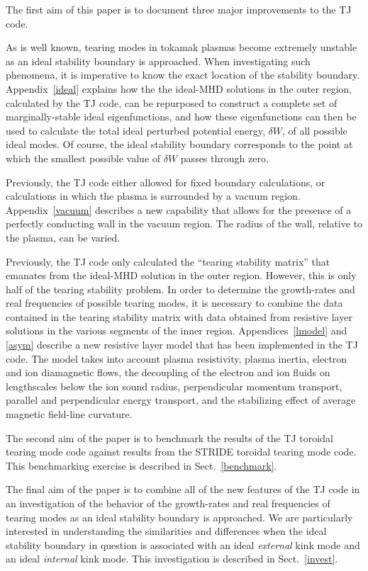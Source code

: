 \documentclass[12pt,prb,aps]{revtex4-1}
\begin{document}
The first aim of this paper is to document three major improvements to the TJ code. 

As is well known, tearing modes in tokamak plasmas become extremely
unstable as an ideal stability boundary is approached.\cite{brennan,bren1,bren2} When investigating such phenomena, it is imperative to know the exact location
of the  stability boundary. Appendix~\ref{ideal} explains how the the ideal-MHD solutions in the outer region, calculated by the TJ code, can be repurposed to
construct a complete set of marginally-stable ideal eigenfunctions, and how these eigenfunctions can then be used to calculate the total ideal perturbed potential
energy, $\delta W$, of all possible ideal modes.  Of course, the ideal stability boundary corresponds to the point at which the smallest possible value of $\delta W$ passes through
zero.\cite{freidberg,ideal}

Previously, the TJ code either allowed for fixed boundary calculations, or calculations in which the plasma is surrounded by a vacuum region. Appendix~\ref{vacuum} describes a
new capability that allows for the presence of a perfectly conducting wall in the vacuum region. The radius of the wall, relative to the plasma, can be varied. 

Previously, the TJ code only calculated the ``tearing stability matrix'' that emanates from the ideal-MHD solution in the outer region. However, this is only half of the tearing stability problem. 
In order to determine the growth-rates and real frequencies of possible tearing modes, it is necessary to combine the data contained in the tearing stability matrix with data obtained from resistive layer solutions
in the various segments of the inner region. Appendices~\ref{lmodel} and \ref{asym}   describe a new resistive layer model that has been implemented in the TJ code. The model takes into account 
plasma resistivity, plasma inertia, electron and ion diamagnetic flows, the decoupling of the electron and ion fluids on lengthscales below the ion sound radius, perpendicular
momentum transport, parallel and perpendicular energy transport, and the stabilizing effect of average magnetic field-line curvature.

The second aim of the paper is to benchmark the results of the TJ toroidal tearing mode code against results from the STRIDE toroidal tearing mode code. This benchmarking
exercise is described in Sect.~\ref{benchmark}. 

The final aim of the paper is to combine all of the new features of the TJ code in an investigation of the behavior of the growth-rates and real frequencies of tearing modes as
an ideal stability boundary is approached. We are particularly interested in understanding the similarities and differences when the ideal stability boundary in question is associated with
an ideal {\em external}\/ kink mode and an ideal {\em internal}\/ kink mode. This investigation is described in Sect.~\ref{invest}.
\end{document}
